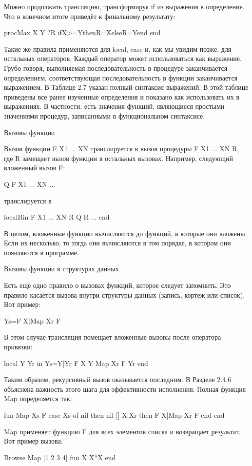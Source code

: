 Можно продолжить трансляцию, трансформируя if из выражения в определение. Что в конечном итоге приведёт к финальному результату:

proc{Max X Y ?R}
ifX>=YthenR=XelseR=Yend
end

Такие же правила применяются для local, case и, как мы увидим позже, для остальных операторов. Каждый оператор может использоваться как выражение. Грубо говоря, выполняемая последовательность в процедуре заканчивается определением, соответствующая последовательность в функции заканчивается выражением. В Таблице 2.7 указан полный синтаксис выражений. В этой таблице приведены все ранее изученные определения и показано как использовать их в выражениях. В частности, есть значения функций, являющиеся простыми значениями процедур, записанными в функциональном синтаксисе.

Вызовы функции

Вызов функции {F X1 ... XN} транслируется в вызов процедуры {F X1 ... XN R}, где R замещает вызов функции в остальных вызовах. Например, следующий вложенный вызов F:

{Q {F X1 ... XN} ... }

транслируется в

localRin
{F X1 ... XN R}
{Q R ... }
end

В целом, вложенные функции вычисляются до функций, в которые они вложены. Если их несколько, то тогда они вычисляются в том порядке, в котором они появляются в программе.

Вызовы функции в структурах данных

Есть ещё одно правило о вызовах функций, которое следует запомнить. Это правило касается вызова внутри структуры данных (запись, кортеж или список). Вот пример:

Ys={F X}|{Map Xr F}

В этом случае трансляция помещает вложенные вызовы после оператора привязки:

local Y Yr in
Ys=Y|Yr
{F X Y}
{Map Xr F Yr}
end

Таким образом, рекурсивный вызов оказывается последним. В Разделе 2.4.6 объяснена важность этого шага для эффективности исполнения. Полная функция Map определяется так:

fun {Map Xs F}
case Xs
of nil then nil
[] X|Xr then {F X}|{Map Xr F}
end
end

Map применяет функцию F для всех элементов списка и возвращает результат. Вот пример вызова:

{Browse {Map [1 2 3 4] fun { X} X*X end}}

